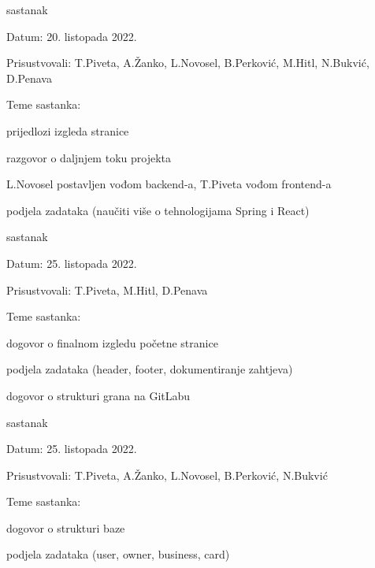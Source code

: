 \begin{packed_enum}
			\item  sastanak
			\item[] \begin{packed_item}
				\item Datum: 20. listopada 2022.
				\item Prisustvovali: T.Piveta, A.Žanko, L.Novosel, B.Perković, M.Hitl, N.Bukvić, D.Penava
				\item Teme sastanka:
				\begin{packed_item}
				    \item  prijedlozi izgleda stranice
				    \item  razgovor o daljnjem toku projekta
				    \item  L.Novosel postavljen vođom backend-a, T.Piveta vođom frontend-a
				    \item  podjela zadataka (naučiti više o tehnologijama Spring i React)
				\end{packed_item}
			\end{packed_item}
			
			\item  sastanak
			\item[] \begin{packed_item}
				\item Datum: 25. listopada 2022.
				\item Prisustvovali: T.Piveta,  M.Hitl, D.Penava
				\item Teme sastanka:
				\begin{packed_item}
				    \item  dogovor o finalnom izgledu početne stranice
				    \item  podjela zadataka (header, footer, dokumentiranje zahtjeva)
				    \item  dogovor o strukturi grana na GitLabu
				\end{packed_item}
			\end{packed_item}
			
			\item  sastanak
			\item[] \begin{packed_item}
				\item Datum: 25. listopada 2022.
				\item Prisustvovali: T.Piveta, A.Žanko, L.Novosel, B.Perković, N.Bukvić
				\item Teme sastanka:
				\begin{packed_item}
				    \item  dogovor o strukturi baze
				    \item  podjela zadataka (user, owner, business, card)
				\end{packed_item}
			\end{packed_item}
			

\end{packed_enum}
